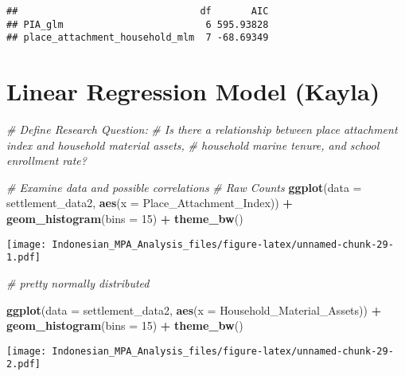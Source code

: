 \documentclass[
]{article}
\newenvironment{Shaded}{\begin{snugshade}}{\end{snugshade}}
\newcommand{\AttributeTok}[1]{\textcolor[rgb]{0.13,0.29,0.53}{#1}}
\newcommand{\CommentTok}[1]{\textcolor[rgb]{0.56,0.35,0.01}{\textit{#1}}}
\newcommand{\DecValTok}[1]{\textcolor[rgb]{0.00,0.00,0.81}{#1}}
\newcommand{\FunctionTok}[1]{\textcolor[rgb]{0.13,0.29,0.53}{\textbf{#1}}}
\newcommand{\NormalTok}[1]{#1}
\newcommand{\SpecialCharTok}[1]{\textcolor[rgb]{0.81,0.36,0.00}{\textbf{#1}}}
\newcommand{\StringTok}[1]{\textcolor[rgb]{0.31,0.60,0.02}{#1}}
\begin{document}
\begin{verbatim}
##                                df       AIC
## PIA_glm                         6 595.93828
## place_attachment_household_mlm  7 -68.69349
\end{verbatim}

\section{Linear Regression Model
(Kayla)}\label{linear-regression-model-kayla}

\begin{Shaded}
\begin{Highlighting}[]
\CommentTok{\# Define Research Question:}
\CommentTok{\# Is there a relationship between place attachment index and household material assets, }
\CommentTok{\# household marine tenure, and school enrollment rate?}

\CommentTok{\# Examine data and possible correlations}
\CommentTok{\# Raw Counts}
\FunctionTok{ggplot}\NormalTok{(}\AttributeTok{data =}\NormalTok{ settlement\_data2, }\FunctionTok{aes}\NormalTok{(}\AttributeTok{x =} \StringTok{\textasciigrave{}}\AttributeTok{Place\_Attachment\_Index}\StringTok{\textasciigrave{}}\NormalTok{)) }\SpecialCharTok{+}
  \FunctionTok{geom\_histogram}\NormalTok{(}\AttributeTok{bins =} \DecValTok{15}\NormalTok{) }\SpecialCharTok{+}
  \FunctionTok{theme\_bw}\NormalTok{()}
\end{Highlighting}
\end{Shaded}

\texttt{[image: Indonesian\_MPA\_Analysis\_files/figure-latex/unnamed-chunk-29-1.pdf]}

\begin{Shaded}
\begin{Highlighting}[]
\CommentTok{\# pretty normally distributed }

\FunctionTok{ggplot}\NormalTok{(}\AttributeTok{data =}\NormalTok{ settlement\_data2, }\FunctionTok{aes}\NormalTok{(}\AttributeTok{x =} \StringTok{\textasciigrave{}}\AttributeTok{Household\_Material\_Assets}\StringTok{\textasciigrave{}}\NormalTok{)) }\SpecialCharTok{+}
  \FunctionTok{geom\_histogram}\NormalTok{(}\AttributeTok{bins =} \DecValTok{15}\NormalTok{) }\SpecialCharTok{+}
  \FunctionTok{theme\_bw}\NormalTok{()}
\end{Highlighting}
\end{Shaded}

\texttt{[image: Indonesian\_MPA\_Analysis\_files/figure-latex/unnamed-chunk-29-2.pdf]}
\end{document}
